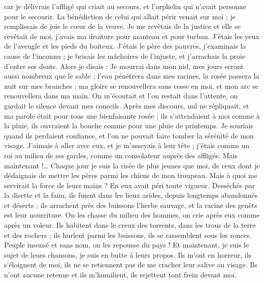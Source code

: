 \begin{multicols}{2}
car je délivrais l'affligé qui criait au secours, et l'orphelin qui n'avait personne pour le secourir.
La bénédiction de celui qui allait périr venait sur moi ; je remplissais de joie le cœur de la veuve.
Je me revêtais de la justice et elle se revêtait de moi, j'avais ma droiture pour manteau et pour turban.
J'étais les yeux de l'aveugle et les pieds du boiteux.
J'étais le père des pauvres, j'examinais la cause de l'inconnu ;
je brisais les mâchoires de l'injuste, et j'arrachais la proie d'entre ses dents.
Alors je disais : Je mourrai dans mon nid, mes jours seront aussi nombreux que le sable ;
l'eau pénétrera dans mes racines, la rosée passera la nuit sur mes branches ;
ma gloire se renouvellera sans cesse en moi, et mon arc se renouvellera dans ma main.
On m'écoutait et l'on restait dans l'attente, on gardait le silence devant mes conseils.
Après mes discours, nul ne répliquait, et ma parole était pour tous une bienfaisante rosée ;
ils s'attendaient à moi comme à la pluie, ils ouvraient la bouche comme pour une pluie de printemps.
Je souriais quand ils perdaient confiance, et l'on ne pouvait faire tomber la sérénité de mon visage.
J'aimais à aller avec eux, et je m'asseyais à leur tête ; j'étais comme un roi au milieu de ses gardes, comme un consolateur auprès des affligés.
\VerseOne{}Mais maintenant !… Chaque jour je suis la risée de plus jeunes que moi, de ceux dont je dédaignais de mettre les pères parmi les chiens de mon troupeau.
Mais à quoi me servirait la force de leurs mains ? En eux avait péri toute vigueur.
Desséchés par la disette et la faim, ils fuient dans les lieux arides, depuis longtemps abandonnés et déserts ;
ils arrachent près des buissons l'herbe sauvage, et la racine des genêts est leur nourriture.
On les chasse du milieu des hommes, on crie après eux comme après un voleur.
Ils habitent dans le creux des torrents, dans les trous de la terre et des rochers ;
ils hurlent parmi les buissons, ils se rassemblent sous les ronces.
Peuple insensé et sans nom, on les repousse du pays !
Et maintenant, je suis le sujet de leurs chansons, je suis en butte à leurs propos.
Ils m'ont en horreur, ils s'éloignent de moi, ils ne se retiennent pas de me cracher leur salive au visage.
Ils n'ont aucune retenue et ils m'humilient, ils rejettent tout frein devant moi.

\end{multicols}

